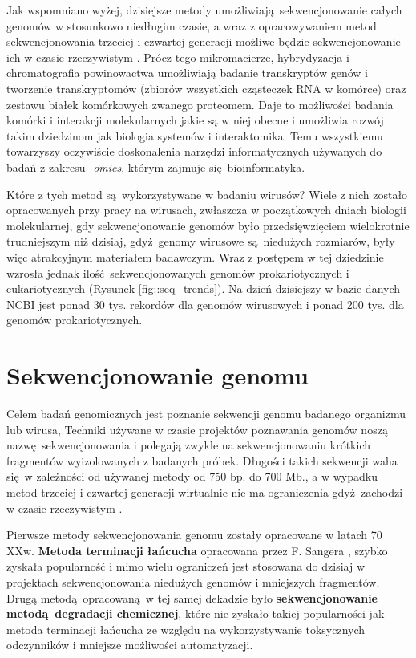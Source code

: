 \documentclass[two column, twoside, a4paper]{article}
\begin{document}
Jak wspomniano wyżej, dzisiejsze metody umożliwiają sekwencjonowanie całych genomów w stosunkowo niedługim czasie, a wraz z opracowywaniem metod sekwencjonowania trzeciej i czwartej generacji możliwe będzie sekwencjonowanie ich w czasie rzeczywistym \autocite{Brown2019}. Prócz tego mikromacierze, hybrydyzacja i chromatografia powinowactwa umożliwiają badanie transkryptów genów i tworzenie transkryptomów (zbiorów wszystkich cząsteczek RNA w komórce) oraz zestawu białek komórkowych zwanego proteomem. Daje to możliwości badania komórki i interakcji molekularnych jakie są w niej obecne i umożliwia rozwój takim dziedzinom jak biologia systemów i interaktomika. Temu wszystkiemu towarzyszy oczywiście doskonalenia narzędzi informatycznych używanych do badań z zakresu \textit{-omics}, którym zajmuje się bioinformatyka.

Które z tych metod są wykorzystywane w badaniu wirusów? Wiele z nich zostało opracowanych przy pracy na wirusach, zwłaszcza w początkowych dniach biologii molekularnej, gdy sekwencjonowanie genomów było przedsięwzięciem wielokrotnie trudniejszym niż dzisiaj, gdyż genomy wirusowe są niedużych rozmiarów, były więc atrakcyjnym materiałem badawczym. Wraz z postępem w tej dziedzinie wzrosła jednak ilość sekwencjonowanych genomów prokariotycznych i eukariotycznych (Rysunek \ref{fig::seq_trends}). Na dzień dzisiejszy w bazie danych NCBI jest ponad 30 tys. rekordów dla genomów wirusowych i ponad 200 tys. dla genomów prokariotycznych.

\section{Sekwencjonowanie genomu}

Celem badań genomicznych jest poznanie sekwencji genomu badanego organizmu lub wirusa, Techniki używane w czasie projektów poznawania genomów noszą nazwę sekwencjonowania i polegają zwykle na sekwencjonowaniu krótkich fragmentów wyizolowanych z badanych próbek. Długości takich sekwencji waha się w zależności od używanej metody od 750 bp. do 700 Mb., a w wypadku metod trzeciej i czwartej generacji wirtualnie nie ma ograniczenia gdyż zachodzi w czasie rzeczywistym \autocite{Brown2019}.

Pierwsze metody sekwencjonowania genomu zostały opracowane w latach 70 XXw. \textbf{Metoda terminacji łańcucha} opracowana przez F. Sangera \autocite{Sanger1977}, szybko zyskała popularność i mimo wielu ograniczeń jest stosowana do dzisiaj w projektach sekwencjonowania niedużych genomów \autocite{Brown2000} i mniejszych fragmentów. Drugą metodą opracowaną w tej samej dekadzie było \textbf{sekwencjonowanie metodą degradacji chemicznej}, które nie zyskało takiej popularności jak metoda terminacji łańcucha ze względu na wykorzystywanie toksycznych odczynników i mniejsze możliwości automatyzacji.
\end{document}
